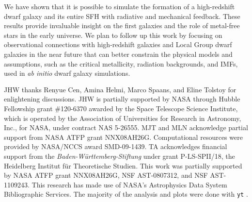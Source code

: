 \documentclass[12pt,preprint]{aastex}
\begin{document}
We have shown that it is possible to simulate the formation of a
high-redshift dwarf galaxy and its entire SFH with radiative and
mechanical feedback.  These results provide invaluable insight on the
first galaxies and the role of metal-free stars in the early universe.
We plan to follow up this work by focusing on observational
connections with high-redshift galaxies and Local Group dwarf galaxies
in the near future that can better constrain the physical models and
assumptions, such as the critical metallicity, radiation backgrounds,
and IMFs, used in \textit{ab initio} dwarf galaxy simulations.

\acknowledgments

JHW thanks Renyue Cen, Amina Helmi, Marco Spaans, and Eline Tolstoy
for enlightening discussions.  JHW is partially supported by NASA
through Hubble Fellowship grant \#120-6370 awarded by the Space
Telescope Science Institute, which is operated by the Association of
Universities for Research in Astronomy, Inc., for NASA, under contract
NAS 5-26555.  MJT and MLN acknowledge partial support from NASA ATFP
grant NNX08AH26G.  Computational resources were provided by NASA/NCCS
award SMD-09-1439.  TA acknowledges financial support from the {\em
  Baden-W\"{u}rttemberg-Stiftung} under grant P-LS-SPII/18, the
Heidelberg Institut f\"ur Theoretische Studien. This work was
partially supported by NASA ATFP grant NNX08AH26G, NSF AST-0807312,
and NSF AST-1109243. This research has made use of NASA’s Astrophysics
Data System Bibliographic Services.  The majority of the analysis and
plots were done with \texttt{yt} \citep{yt_full_paper}.


\end{document}
